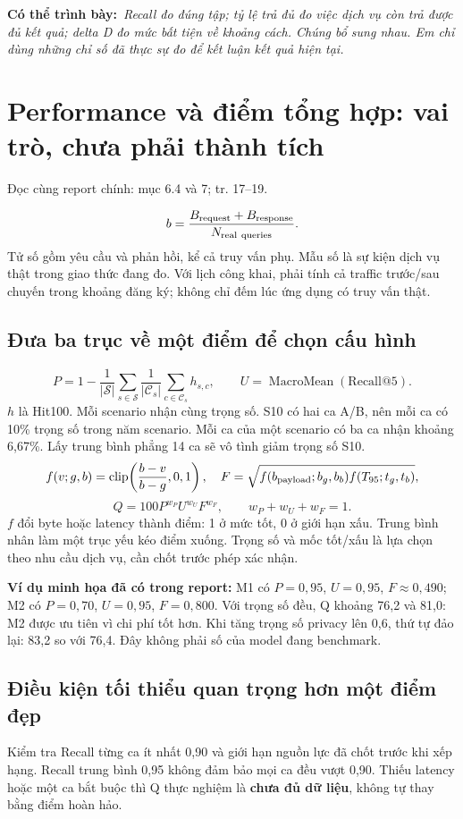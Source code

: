 \documentclass[10pt,a4paper]{article}
\newcommand{\say}[1]{\par\textbf{Có thể trình bày:}\ \textit{#1}\par}
\newcommand{\where}[1]{\par{\small\color{gray}Đọc cùng report chính: #1.}\par}
\newcommand{\guidepage}[1]{\clearpage\section{#1}}
\begin{document}
\say{Recall đo đúng tập; tỷ lệ trả đủ đo việc dịch vụ còn trả được đủ kết quả; delta D đo mức bất tiện về khoảng cách. Chúng bổ sung nhau. Em chỉ dùng những chỉ số đã thực sự đo để kết luận kết quả hiện tại.}

\guidepage{Performance và điểm tổng hợp: vai trò, chưa phải thành tích}
\where{mục 6.4 và 7; tr. 17--19}
\[
b=\frac{B_{\rm request}+B_{\rm response}}{N_{\rm real\ queries}}.
\]
Tử số gồm yêu cầu và phản hồi, kể cả truy vấn phụ. Mẫu số là sự kiện dịch vụ thật trong giao thức đang đo. Với lịch công khai, phải tính cả traffic trước/sau chuyến trong khoảng đăng ký; không chỉ đếm lúc ứng dụng có truy vấn thật.

\subsection*{Đưa ba trục về một điểm để chọn cấu hình}
\[
P=1-\frac1{|\mathcal S|}\sum_{s\in\mathcal S}\frac1{|\mathcal C_s|}\sum_{c\in\mathcal C_s}h_{s,c},
\qquad U=\operatorname{MacroMean}(\mathrm{Recall@5}).
\]
$h$ là Hit100. Mỗi scenario nhận cùng trọng số. S10 có hai ca A/B, nên mỗi ca có 10\% trọng số trong năm scenario. Mỗi ca của một scenario có ba ca nhận khoảng 6,67\%. Lấy trung bình phẳng 14 ca sẽ vô tình giảm trọng số S10.
\[
f(v;g,b)=\operatorname{clip}\!\left(\frac{b-v}{b-g},0,1\right),\quad
F=\sqrt{f(b_{\rm payload};b_g,b_b)f(T_{95};t_g,t_b)},
\]
\[
Q=100P^{w_P}U^{w_U}F^{w_F},\qquad w_P+w_U+w_F=1.
\]
$f$ đổi byte hoặc latency thành điểm: 1 ở mức tốt, 0 ở giới hạn xấu. Trung bình nhân làm một trục yếu kéo điểm xuống. Trọng số và mốc tốt/xấu là lựa chọn theo nhu cầu dịch vụ, cần chốt trước phép xác nhận.

\textbf{Ví dụ minh họa đã có trong report:} M1 có $P=0,95$, $U=0,95$, $F\approx0,490$; M2 có $P=0,70$, $U=0,95$, $F=0,800$. Với trọng số đều, Q khoảng 76,2 và 81,0: M2 được ưu tiên vì chi phí tốt hơn. Khi tăng trọng số privacy lên 0,6, thứ tự đảo lại: 83,2 so với 76,4. Đây không phải số của model đang benchmark.

\subsection*{Điều kiện tối thiểu quan trọng hơn một điểm đẹp}
Kiểm tra Recall từng ca ít nhất 0,90 và giới hạn nguồn lực đã chốt trước khi xếp hạng. Recall trung bình 0,95 không đảm bảo mọi ca đều vượt 0,90. Thiếu latency hoặc một ca bắt buộc thì Q thực nghiệm là \textbf{chưa đủ dữ liệu}, không tự thay bằng điểm hoàn hảo.
\end{document}
